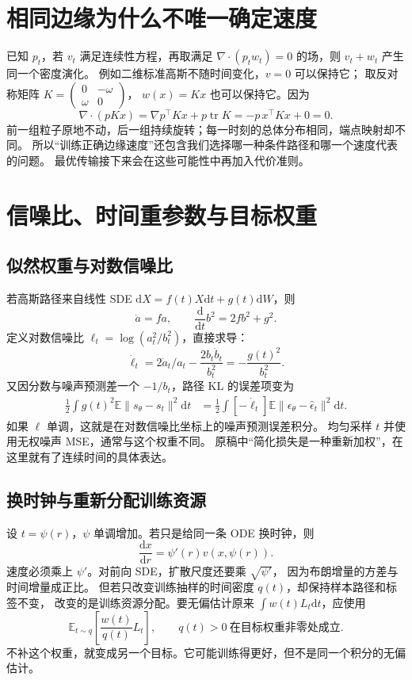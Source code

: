 \section{相同边缘为什么不唯一确定速度}
已知 $p_t$，若 $v_t$ 满足连续性方程，再取满足
$\nabla\cdot(p_tw_t)=0$ 的场，则 $v_t+w_t$ 产生同一个密度演化。
例如二维标准高斯不随时间变化，$v=0$ 可以保持它；
取反对称矩阵
$K=\left(\begin{smallmatrix}0&-\omega\\\omega&0\end{smallmatrix}\right)$，
$w(x)=Kx$ 也可以保持它。因为
\[
\nabla\cdot(pKx)=\nabla p^\top Kx+p\operatorname{tr}K
=-p\,x^\top Kx+0=0.
\]
前一组粒子原地不动，后一组持续旋转；每一时刻的总体分布相同，端点映射却不同。
所以“训练正确边缘速度”还包含我们选择哪一种条件路径和哪一个速度代表的问题。
最优传输接下来会在这些可能性中再加入代价准则。

\section{信噪比、时间重参数与目标权重}
\subsection{似然权重与对数信噪比}
若高斯路径来自线性 SDE
$\mathrm dX=f(t)X\mathrm dt+g(t)\mathrm dW$，则
\[
\dot a=fa,\qquad \frac{\mathrm d}{\mathrm dt}b^2=2fb^2+g^2.
\]
定义对数信噪比 $\ell_t=\log(a_t^2/b_t^2)$，直接求导：
\[
\dot\ell_t=2\dot a_t/a_t-\frac{2b_t\dot b_t}{b_t^2}
=-\frac{g(t)^2}{b_t^2}.
\]
又因分数与噪声预测差一个 $-1/b_t$，路径 KL 的误差项变为
\begin{align}
\frac12\int g(t)^2\mathbb E\|s_\theta-s_t\|^2\mathrm dt
 &=\frac12\int[-\dot\ell_t]
 \mathbb E\|\epsilon_\theta-\hat\epsilon_t\|^2\mathrm dt.
\end{align}
如果 $\ell$ 单调，这就是在对数信噪比坐标上的噪声预测误差积分。
均匀采样 $t$ 并使用无权噪声 MSE，通常与这个权重不同。
原稿中“简化损失是一种重新加权”，在这里就有了连续时间的具体表达。

\subsection{换时钟与重新分配训练资源}
设 $t=\psi(r)$，$\psi$ 单调增加。若只是给同一条 ODE 换时钟，则
\[
\frac{\mathrm dx}{\mathrm dr}=\psi'(r)v(x,\psi(r)).
\]
速度必须乘上 $\psi'$。对前向 SDE，扩散尺度还要乘 $\sqrt{\psi'}$，
因为布朗增量的方差与时间增量成正比。
但若只改变训练抽样的时间密度 $q(t)$，却保持样本路径和标签不变，
改变的是训练资源分配。要无偏估计原来 $\int w(t)L_t\mathrm dt$，应使用
\[
\mathbb E_{t\sim q}\left[\frac{w(t)}{q(t)}L_t\right],\qquad q(t)>0
\ \text{在目标权重非零处成立}.
\]
不补这个权重，就变成另一个目标。它可能训练得更好，但不是同一个积分的无偏估计。

